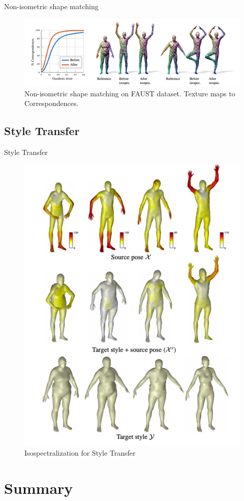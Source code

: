 \documentclass{beamer}
\begin{document}
\begin{frame}{Non-isometric shape matching}
    
\begin{figure}
 \includegraphics[width=\textwidth]{FAUST.png}
 \caption{\label{fig:FAUST} Non-isometric shape matching on FAUST dataset. Texture maps to Correspondences.}
\end{figure}
    
    
\end{frame}




\subsection{Style Transfer}

\begin{frame}{Style Transfer}
\begin{figure}
    \centering
    \includegraphics[height=0.5\textwidth]{Styletransfer.png}
    \caption{Isospectralization for Style Transfer}
    \label{fig:styletransfer}
\end{figure}
    
\end{frame}


\section{Summary}
\end{document}
